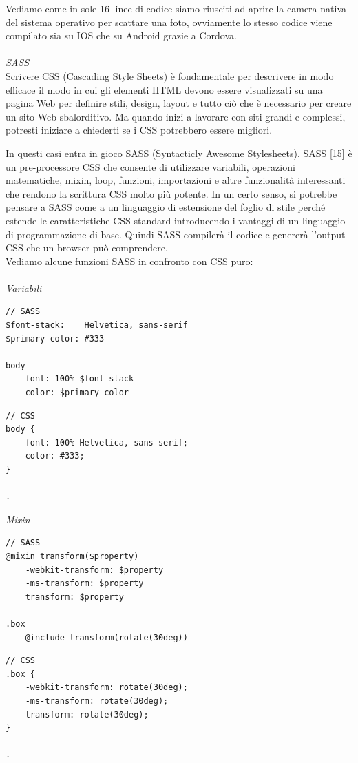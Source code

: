 Vediamo come in sole 16 linee di codice siamo riusciti ad aprire la camera nativa del sistema operativo per scattare
una foto, ovviamente lo stesso codice viene compilato sia su IOS che su Android grazie a Cordova.
\\\\
\textit{SASS}\\
Scrivere CSS (Cascading Style Sheets) è fondamentale per descrivere in modo efficace il modo in cui gli elementi HTML devono 
essere visualizzati su una pagina Web per definire stili, design, layout e tutto ciò che è necessario per creare un sito 
Web sbalorditivo. Ma quando inizi a lavorare con siti grandi e complessi, potresti iniziare a chiederti se i CSS potrebbero 
essere migliori. 

In questi casi entra in gioco SASS (Syntacticly Awesome Stylesheets).
SASS [15] è un pre-processore CSS che consente di utilizzare variabili, operazioni matematiche, mixin, loop, funzioni, importazioni 
e altre funzionalità interessanti che rendono la scrittura CSS molto più potente. In un certo senso, si potrebbe pensare a 
SASS come a un linguaggio di estensione del foglio di stile perché estende le caratteristiche CSS standard introducendo i
vantaggi di un linguaggio di programmazione di base. Quindi SASS compilerà il codice e genererà l'output CSS che un
browser può comprendere. \\
Vediamo alcune funzioni SASS in confronto con CSS puro:\\\\

\textit{Variabili}
\begin{multicols}{2}
    \begin{lstlisting}
// SASS
$font-stack:    Helvetica, sans-serif
$primary-color: #333

body
    font: 100% $font-stack
    color: $primary-color
    \end{lstlisting}
    \columnbreak
    \begin{lstlisting}
// CSS
body {
    font: 100% Helvetica, sans-serif;
    color: #333;
} 

.
    \end{lstlisting}
\end{multicols}

\begin{multicols}{2}
    \columnbreak
\end{multicols}
\textit{Mixin}
\begin{multicols}{2}
    \begin{lstlisting}
// SASS
@mixin transform($property) 
    -webkit-transform: $property
    -ms-transform: $property
    transform: $property

.box
    @include transform(rotate(30deg))   
    \end{lstlisting}
    \columnbreak
    \begin{lstlisting}
// CSS
.box {
    -webkit-transform: rotate(30deg);
    -ms-transform: rotate(30deg);
    transform: rotate(30deg);
}

.
    \end{lstlisting}
\end{multicols}


